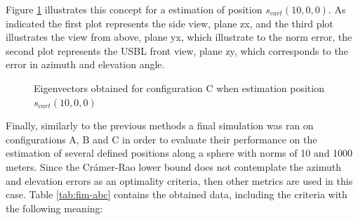 Figure \ref{fig:fim-eigvec-10,0,0-C} illustrates this concept for a estimation of position $s_{cart}(10,0,0)$. As indicated the first plot represents the side view, plane zx, and the third plot illustrates the view from above, plane yx, which illustrate to the norm error, the second plot represents the USBL front view, plane zy, which corresponds to the error in azimuth and elevation angle. 

\begin{figure}[!htb]
	\captionsetup{justification=centering,margin=2cm}
	\caption{Eigenvectors obtained for configuration C when estimation position $s_{cart}(10,0,0)$ }
	\label{fig:fim-eigvec-10,0,0-C}
\end{figure}

Finally, similarly to the previous methods a final simulation was ran on configurations A, B and C in order to evaluate their performance on the estimation of several defined positions along a sphere with norms of 10 and 1000 meters. Since the Crámer-Rao lower bound does not contemplate the azimuth and elevation errors as an optimality criteria, then other metrics are used in this case. Table  \ref{tab:fim-abc} contains the obtained data, including the criteria with the following meaning:  

